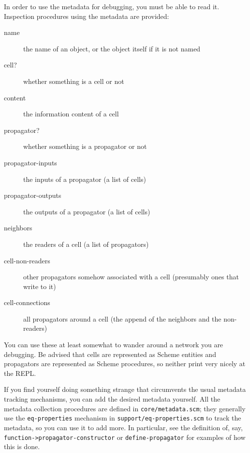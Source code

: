 \documentclass[12pt,letterpaper,english]{article}
\begin{document}
In order to use the metadata for debugging, you must be able to read
it.  Inspection procedures using the metadata are provided:
\begin{description}
\item[{name}] \leavevmode 
the name of an object, or the object itself if it is not named

\item[{cell?}] \leavevmode 
whether something is a cell or not

\item[{content}] \leavevmode 
the information content of a cell

\item[{propagator?}] \leavevmode 
whether something is a propagator or not

\item[{propagator-inputs}] \leavevmode 
the inputs of a propagator (a list of cells)

\item[{propagator-outputs}] \leavevmode 
the outputs of a propagator (a list of cells)

\item[{neighbors}] \leavevmode 
the readers of a cell (a list of propagators)

\item[{cell-non-readers}] \leavevmode 
other propagators somehow associated with a cell (presumably ones
that write to it)

\item[{cell-connections}] \leavevmode 
all propagators around a cell (the append of the neighbors
and the non-readers)

\end{description}

You can use these at least somewhat to wander around a network you are
debugging.  Be advised that cells are represented as Scheme entities
and propagators are represented as Scheme procedures, so neither print
very nicely at the REPL.

If you find yourself doing something strange that circumvents the
usual metadata tracking mechanisms, you can add the desired metadata
yourself.  All the metadata collection procedures are defined in
\texttt{core/metadata.scm}; they generally use the \texttt{eq-properties}
mechanism in \texttt{support/eq-properties.scm} to track the metadata, so
you can use it to add more.  In particular, see the definition of, say,
\texttt{function->propagator-constructor} or \texttt{define-propagator}
for examples of how this is done.
\end{document}
